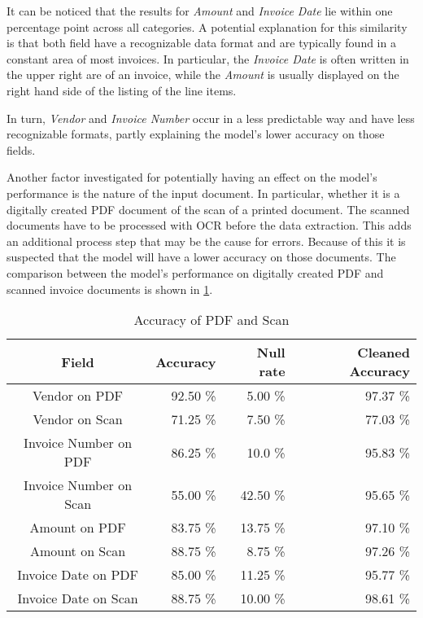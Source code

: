 It can be noticed that the results for \textit{Amount} and \textit{Invoice Date} lie within one percentage point across all categories. A potential explanation for this similarity is that both field have a recognizable data format and are typically found in a constant area of most invoices. In particular, the \textit{Invoice Date} is often written in the upper right are of an invoice, while the \textit{Amount} is usually displayed on the right hand side of the listing of the line items.

In turn, \textit{Vendor} and \textit{Invoice Number} occur in a less predictable way and have less recognizable formats, partly explaining the model's lower accuracy on those fields.

Another factor investigated for potentially having an effect on the model's performance is the nature of the input document. In particular, whether it is a digitally created PDF document of the scan of a printed document. The scanned documents have to be processed with \ac{OCR} before the data extraction. This adds an additional process step that may be the cause for errors. Because of this it is suspected that the model will have a lower accuracy on those documents. The comparison between the model's performance on digitally created PDF and scanned invoice documents is shown in \cref{table:Field_Com_Scan_PDF}.

\begin{table}[ht]   %
    \centering
    \footnotesize
    \begin{tabular}{c|rrr} %
        \toprule    %
        Field  & Accuracy  & Null rate & Cleaned Accuracy \\
        \midrule    %
        Vendor on PDF    & 92.50 \%   &  5.00 \%   & 97.37 \% \\
        Vendor on Scan   & 71.25 \%   &  7.50 \%   & 77.03 \% \\
        \midrule    %
        Invoice Number on PDF & 86.25 \%   & 10.0 \%  & 95.83 \%\\
        Invoice Number on Scan & 55.00 \%  & 42.50 \%  & 95.65 \%\\
        \midrule    %
        Amount on PDF      & 83.75 \%   & 13.75 \%  & 97.10 \% \\
        Amount on Scan     & 88.75 \%   & 8.75 \%  & 97.26 \% \\
        \midrule    %
        Invoice Date on PDF  & 85.00 \%   & 11.25  \%  & 95.77 \% \\
        Invoice Date on Scan & 88.75 \%   & 10.00  \%  & 98.61 \% \\
        
        \bottomrule %
    \end{tabular}
    \caption{Accuracy of PDF and Scan}
    \label{table:Field_Com_Scan_PDF}
\end{table}

